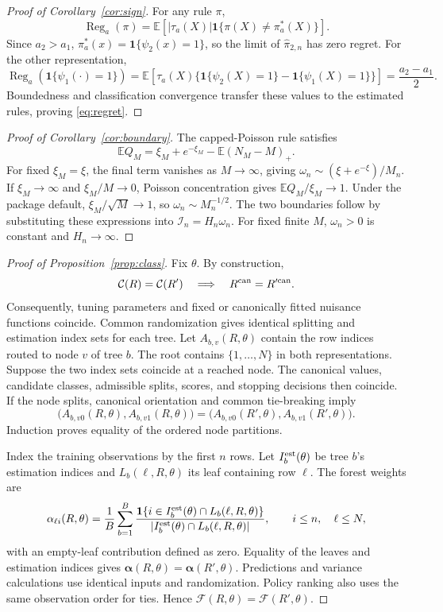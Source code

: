 \documentclass[12pt]{article}
\newcommand{\E}{\mathbb E}
\newcommand{\one}{\mathbf 1}
\begin{document}
\begin{appendix}
\begin{proof}[Proof of Corollary~\ref{cor:sign}]
For any rule \(\pi\),
\[
\operatorname{Reg}_a(\pi)
=\E\!\left[|\tau_a(X)|
\one\{\pi(X)\ne\pi_a^*(X)\}\right].
\]
Since \(a_2>a_1\), \(\pi_a^*(x)=\one\{\psi_2(x)=1\}\), so the limit of \(\widehat\pi_{2,n}\) has zero regret. For the other representation,
\[
\operatorname{Reg}_a(\one\{\psi_1(\cdot)=1\})
=\E\!\left[\tau_a(X)
\{\one\{\psi_2(X)=1\}-\one\{\psi_1(X)=1\}\}\right]
=\frac{a_2-a_1}{2}.
\]
Boundedness and classification convergence transfer these values to the estimated rules, proving \eqref{eq:regret}.
\end{proof}

\begin{proof}[Proof of Corollary~\ref{cor:boundary}]
The capped-Poisson rule satisfies
\[
\E Q_M=\xi_M+e^{-\xi_M}-\E(N_M-M)_+.
\]
For fixed \(\xi_M=\xi\), the final term vanishes as \(M\to\infty\), giving \(\omega_n\sim(\xi+e^{-\xi})/M_n\). If \(\xi_M\to\infty\) and \(\xi_M/M\to0\), Poisson concentration gives \(\E Q_M/\xi_M\to1\). Under the package default, \(\xi_M/\sqrt M\to1\), so \(\omega_n\sim M_n^{-1/2}\). The two boundaries follow by substituting these expressions into \(\mathcal I_n=H_n\omega_n\). For fixed finite \(M\), \(\omega_n>0\) is constant and \(H_n\to\infty\).
\end{proof}

\begin{proof}[Proof of Proposition~\ref{prop:class}]
Fix \(\theta\). By construction,
\[
\mathcal C(R)=\mathcal C(R')
\quad\Longrightarrow\quad R^{\rm can}=R'^{\rm can}.
\]
Consequently, tuning parameters and fixed or canonically fitted nuisance functions coincide. Common randomization gives identical splitting and estimation index sets for each tree. Let \(A_{b,v}(R,\theta)\) contain the row indices routed to node \(v\) of tree \(b\). The root contains \(\{1,\ldots,N\}\) in both representations. Suppose the two index sets coincide at a reached node. The canonical values, candidate classes, admissible splits, scores, and stopping decisions then coincide. If the node splits, canonical orientation and common tie-breaking imply
\[
\bigl(A_{b,v0}(R,\theta),A_{b,v1}(R,\theta)\bigr)
=\bigl(A_{b,v0}(R',\theta),A_{b,v1}(R',\theta)\bigr).
\]
Induction proves equality of the ordered node partitions.

Index the training observations by the first \(n\) rows. Let \(I_b^{\rm est}(\theta)\) be tree \(b\)'s estimation indices and \(L_b(\ell,R,\theta)\) its leaf containing row \(\ell\). The forest weights are
\[
\alpha_{\ell i}(R,\theta)=\frac1B\sum_{b=1}^B
\frac{\one\{i\in I_b^{\rm est}(\theta)\cap L_b(\ell,R,\theta)\}}
{|I_b^{\rm est}(\theta)\cap L_b(\ell,R,\theta)|},
\qquad i\le n,\quad\ell\le N,
\]
with an empty-leaf contribution defined as zero. Equality of the leaves and estimation indices gives \(\boldsymbol\alpha(R,\theta)=\boldsymbol\alpha(R',\theta)\). Predictions and variance calculations use identical inputs and randomization. Policy ranking also uses the same observation order for ties. Hence \(\mathcal F(R,\theta)=\mathcal F(R',\theta)\).
\end{proof}

\end{appendix}
\end{document}
